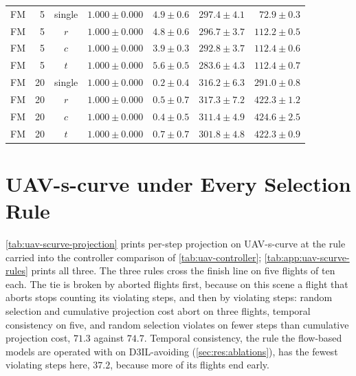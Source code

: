 \begin{table}[htpb]
\begin{tabularx}{\linewidth}{@{}L r c rrrr@{}}
    \addlinespace[2pt]
    FM & 5 & single & $1.000 \pm 0.000$ & $4.9 \pm 0.6$ & $297.4 \pm 4.1$ & $72.9 \pm 0.3$ \\
    FM & 5 & $r$ & $1.000 \pm 0.000$ & $4.8 \pm 0.6$ & $296.7 \pm 3.7$ & $112.2 \pm 0.5$ \\
    FM & 5 & $c$ & $1.000 \pm 0.000$ & $3.9 \pm 0.3$ & $292.8 \pm 3.7$ & $112.4 \pm 0.6$ \\
    FM & 5 & $t$ & $1.000 \pm 0.000$ & $5.6 \pm 0.5$ & $283.6 \pm 4.3$ & $112.4 \pm 0.7$ \\
    \addlinespace[2pt]
    FM & 20 & single & $1.000 \pm 0.000$ & $0.2 \pm 0.4$ & $316.2 \pm 6.3$ & $291.0 \pm 0.8$ \\
    FM & 20 & $r$ & $1.000 \pm 0.000$ & $0.5 \pm 0.7$ & $317.3 \pm 7.2$ & $422.3 \pm 1.2$ \\
    FM & 20 & $c$ & $1.000 \pm 0.000$ & $0.4 \pm 0.5$ & $311.4 \pm 4.9$ & $424.6 \pm 2.5$ \\
    FM & 20 & $t$ & $1.000 \pm 0.000$ & $0.7 \pm 0.7$ & $301.8 \pm 4.8$ & $422.3 \pm 0.9$ \\
    \bottomrule
  \end{tabularx}
\end{table}

\FloatBarrier

\section{UAV-s-curve under Every Selection Rule}\label{app:uav-scurve-rules}

\autoref{tab:uav-scurve-projection} prints per-step projection on UAV-s-curve at the rule carried into the
controller comparison of \autoref{tab:uav-controller}; \autoref{tab:app:uav-scurve-rules} prints all three. The
three rules cross the finish line on five flights of ten each. The tie is broken by aborted flights first,
because on this scene a flight that aborts stops counting its violating steps, and then by violating steps:
random selection and cumulative projection cost abort on three flights, temporal consistency on five, and
random selection violates on fewer steps than cumulative projection cost, $71.3$ against $74.7$. Temporal
consistency, the rule the flow-based models are operated with on D3IL-avoiding (\autoref{sec:res:ablations}),
has the fewest violating steps here, $37.2$, because more of its flights end early.

